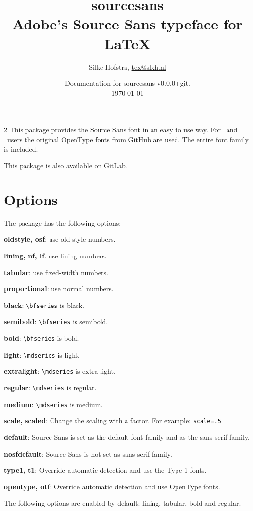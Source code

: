 \documentclass[10pt,a4paper,english]{article}
\title{\bfseries
	\Huge sourcesans\\
	\Large Adobe's Source Sans typeface for \LaTeX
}
\author{Silke Hofstra, \href{mailto:tex@slxh.nl}{tex@slxh.nl}}
\date{Documentation for sourcesans v0.0.0+git.\\ \today}
\begin{document}
\maketitle
\begin{multicols}{2}
This package provides the Source Sans font in an easy to use way. For \XeLaTeX\ and \LuaLaTeX\ users the original OpenType fonts from \href{https://github.com/adobe-fonts/source-sans}{GitHub} are used. The entire font family is included.

This package is also available on \href{https://gitlab.com/slxh/latex/sourcesans}{GitLab}.


\section{Options}
The package has the following options:
\begin{itemize*}
	\item \textbf{oldstyle, osf}:  use old style numbers.
	\item \textbf{lining, nf, lf}: use lining numbers.
	\item \textbf{tabular}:        use fixed-width numbers.
	\item \textbf{proportional}:   use normal numbers.
	\item \textbf{black}:          \texttt{\textbackslash bfseries} is black.
	\item \textbf{semibold}:       \texttt{\textbackslash bfseries} is semibold.
	\item \textbf{bold}:           \texttt{\textbackslash bfseries} is bold.
	\item \textbf{light}:          \texttt{\textbackslash mdseries} is light.
	\item \textbf{extralight}:     \texttt{\textbackslash mdseries} is extra light.
	\item \textbf{regular}:        \texttt{\textbackslash mdseries} is regular.
	\item \textbf{medium}:         \texttt{\textbackslash mdseries} is medium.
	\item \textbf{scale, scaled}:  Change the scaling with a factor. For example:  \texttt{scale=.5}
	\item \textbf{default}:        Source Sans is set as the default font family and as the sans serif family.
	\item \textbf{nosfdefault}:    Source Sans is not set as sans-serif family.
	\item \textbf{type1, t1}:      Override automatic detection and use the Type 1 fonts.
	\item \textbf{opentype, otf}:  Override automatic detection and use OpenType fonts.
\end{itemize*}
The following options are enabled by default: lining, tabular, bold and regular.


\end{multicols}
\end{document}
